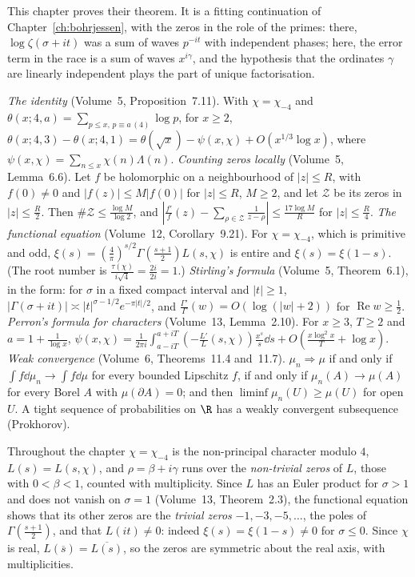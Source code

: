 This chapter proves their theorem. It is a fitting continuation of Chapter~\ref{ch:bohrjessen}, with the zeros in the role of the primes: there, $\log\zeta(\sigma+it)$ was a sum of waves $p^{-it}$ with independent phases; here, the error term in the race is a sum of waves $x^{i\gamma}$, and the hypothesis that the ordinates $\gamma$ are linearly independent plays the part of unique factorisation.

\begin{reminder}
\emph{The identity} (Volume~5, Proposition~7.11). With $\chi=\chi_{-4}$ and $\theta(x;4,a)=\sum_{p\le x,\,p\equiv a\,(4)}\log p$, for $x\ge2$,
$\theta(x;4,3)-\theta(x;4,1)=\theta(\sqrt x)-\psi(x,\chi)+O(x^{1/3}\log x)$, where $\psi(x,\chi)=\sum_{n\le x}\chi(n)\Lambda(n)$.
\emph{Counting zeros locally} (Volume~5, Lemma~6.6). Let $f$ be holomorphic on a neighbourhood of $|z|\le R$, with $f(0)\ne0$ and $|f(z)|\le M|f(0)|$ for $|z|\le R$, $M\ge2$, and let $\mathcal Z$ be its zeros in $|z|\le\frac R2$. Then $\#\mathcal Z\le\frac{\log M}{\log2}$, and $|\frac{f'}f(z)-\sum_{\rho\in\mathcal Z}\frac1{z-\rho}|\le\frac{17\log M}R$ for $|z|\le\frac R4$.
\emph{The functional equation} (Volume~12, Corollary~9.21). For $\chi=\chi_{-4}$, which is primitive and odd, $\xi(s)=(\frac4\pi)^{s/2}\Gamma(\frac{s+1}2)L(s,\chi)$ is entire and $\xi(s)=\xi(1-s)$. (The root number is $\frac{\tau(\chi)}{i\sqrt4}=\frac{2i}{2i}=1$.)
\emph{Stirling's formula} (Volume~5, Theorem~6.1), in the form: for $\sigma$ in a fixed compact interval and $|t|\ge1$, $|\Gamma(\sigma+it)|\asymp|t|^{\sigma-1/2}e^{-\pi|t|/2}$, and $\frac{\Gamma'}\Gamma(w)=O(\log(|w|+2))$ for $\operatorname{Re}w\ge\frac12$.
\emph{Perron's formula for characters} (Volume~13, Lemma~2.10). For $x\ge3$, $T\ge2$ and $a=1+\frac1{\log x}$, $\psi(x,\chi)=\frac1{2\pi i}\int_{a-iT}^{a+iT}(-\frac{L'}L(s,\chi))\frac{x^s}s\dd s+O(\frac{x\log^2x}T+\log x)$.
\emph{Weak convergence} (Volume~6, Theorems~11.4 and~11.7). $\mu_n\Rightarrow\mu$ if and only if $\int f\dd\mu_n\to\int f\dd\mu$ for every bounded Lipschitz $f$, if and only if $\mu_n(A)\to\mu(A)$ for every Borel $A$ with $\mu(\partial A)=0$; and then $\liminf\mu_n(U)\ge\mu(U)$ for open $U$. A tight sequence of probabilities on $\R$ has a weakly convergent subsequence (Prokhorov).
\end{reminder}

Throughout the chapter $\chi=\chi_{-4}$ is the non-principal character modulo $4$, $L(s)=L(s,\chi)$, and $\rho=\beta+i\gamma$ runs over the \emph{non-trivial zeros} of $L$, those with $0<\beta<1$, counted with multiplicity. Since $L$ has an Euler product for $\sigma>1$ and does not vanish on $\sigma=1$ (Volume~13, Theorem~2.3), the functional equation shows that its other zeros are the \emph{trivial zeros} $-1,-3,-5,\dots$, the poles of $\Gamma(\frac{s+1}2)$, and that $L(it)\ne0$: indeed $\xi(s)=\xi(1-s)\ne0$ for $\sigma\le0$. Since $\chi$ is real, $L(\overline s)=\overline{L(s)}$, so the zeros are symmetric about the real axis, with multiplicities.

